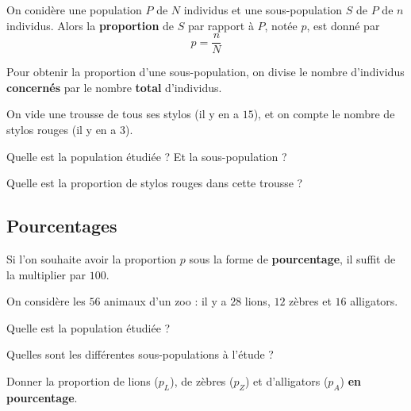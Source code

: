 \documentclass{article}
\begin{document}
\begin{tcolorbox}
\begin{definition}
On conidère une population $P$ de $N$ individus et une sous-population $S$ de $P$ de $n$ individus. Alors la \textbf{proportion} de $S$ par rapport à $P$, notée $p$, est donné par
\begin{equation*}
p = \dfrac{n}{N}
\end{equation*}        
\end{definition}
\end{tcolorbox}
\begin{remark}
Pour obtenir la proportion d'une sous-population, on divise le nombre d'individus \textbf{concernés} par le nombre \textbf{total} d'individus. 
\end{remark}
\begin{example}
On vide une trousse de tous ses stylos (il y en a $15$), et on compte le nombre de stylos rouges (il y en a $3$). 
\begin{enumquestions}
\item Quelle est la population étudiée ? Et la sous-population ?
\item Quelle est la proportion de stylos rouges dans cette trousse ?
\end{enumquestions}

\emptybox{4cm}
\end{example}
\newpage

\subsection{Pourcentages}
\begin{tcolorbox}
\begin{remark}
Si l'on souhaite avoir la proportion $p$ sous la forme de \textbf{pourcentage}, il suffit de la multiplier par $100$.
\end{remark}
\end{tcolorbox}
\begin{example}
On considère les $56$ animaux d'un zoo : il y a $28$ lions, $12$ zèbres et $16$ alligators.
\begin{enumquestions}
\item Quelle est la population étudiée ?
\item Quelles sont les différentes sous-populations à l'étude ?
\item Donner la proportion de lions ($p_L$), de zèbres ($p_Z$) et d'alligators ($p_A$) \textbf{en pourcentage}.
\end{enumquestions}

\emptybox{4cm}
\end{example}
\end{document}
